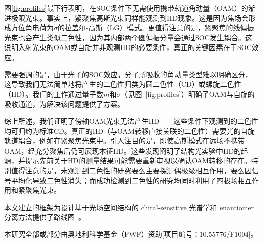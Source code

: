 \documentclass[reprint,aps,prl,twocolumn,superscriptaddress,groupedaddress]{revtex4-2}
\begin{document}
\begin{CJK*}{UTF8}{gbsn}
图\ref{fig:profiles}最下行表明，在SOC条件下无需使用携带轨道角动量（OAM）的渐进极限光束。事实上，紧聚焦高斯光束同样能观测到HD现象。这是因为焦场会形成方位角电荷为$\sigma$的拉盖尔-高斯（LG）模式。更值得注意的是，紧聚焦的线偏振光束也会产生类似二色性，因为其内部两个圆偏振分量会通过SOC发生耦合。这说明入射光束的OAM或自旋并非观测HD的必要条件，真正的关键因素在于SOC效应。

需要强调的是，由于光子的SOC效应，分子所吸收的角动量类型难以明确区分，这导致我们无法简单地将产生的二色性归类为圆二色性（CD）或螺旋二色性（HD）。我们的工作通过量子数$m$和$\sigma$（见图~\ref{fig:profiles}）明确了OAM与自旋的吸收通道，为解决该问题提供了方案。

综上所述，我们证明了傍轴OAM光束无法产生HD——这些条件下观测到的二色性均可归约为标准CD。真正的HD（与OAM转移直接关联的二色性）需要光的自旋-轨道耦合，例如在紧聚焦光束中。引人注目的是，即使高斯模式在远场不携带OAM，经充分聚焦后仍可展现本征HD。这些发现阐明了结构光实验中HD的起源，并提示先前关于HD的测量结果可能需要重新审视以确认OAM转移的存在。特别值得注意的是，未观测到二色性的研究要么主要探测偶极级相互作用\cite{Araoka2005}，要么因信号平均化导致二色性消失\cite{Loeffler2011}；而成功检测到二色性的研究均同时利用了四极场相互作用和紧聚焦光束\cite{Rusak2019,Rouxel2022,Begin2023,Jain2023}。

本文建立的框架为设计基于光场空间结构的 chiral-sensitive 光谱学和 enantiomer 分离方法提供了路线图~\cite{Leibscher2022}。\\
\begin{acknowledgments}
本研究全部或部分由奥地利科学基金（FWF）资助[项目编号：10.55776/F1004]。
\end{acknowledgments}

\end{CJK*}
\end{document}
